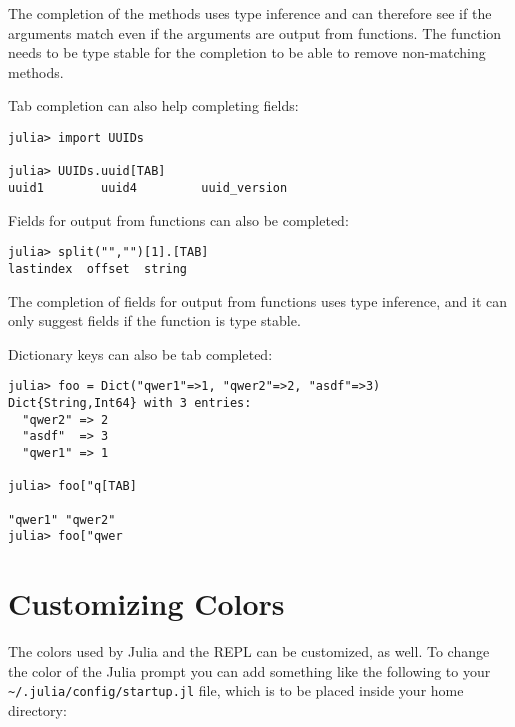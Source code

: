 The completion of the methods uses type inference and can therefore see if the arguments match even if the arguments are output from functions. The function needs to be type stable for the completion to be able to remove non-matching methods.



Tab completion can also help completing fields:




\begin{verbatim}
julia> import UUIDs

julia> UUIDs.uuid[TAB]
uuid1        uuid4         uuid_version
\end{verbatim}



Fields for output from functions can also be completed:




\begin{verbatim}
julia> split("","")[1].[TAB]
lastindex  offset  string
\end{verbatim}



The completion of fields for output from functions uses type inference, and it can only suggest fields if the function is type stable.



Dictionary keys can also be tab completed:




\begin{verbatim}
julia> foo = Dict("qwer1"=>1, "qwer2"=>2, "asdf"=>3)
Dict{String,Int64} with 3 entries:
  "qwer2" => 2
  "asdf"  => 3
  "qwer1" => 1

julia> foo["q[TAB]

"qwer1" "qwer2"
julia> foo["qwer
\end{verbatim}



\hypertarget{17268458035861597176}{}


\section{Customizing Colors}



The colors used by Julia and the REPL can be customized, as well. To change the color of the Julia prompt you can add something like the following to your \texttt{{\textasciitilde}/.julia/config/startup.jl} file, which is to be placed inside your home directory:




